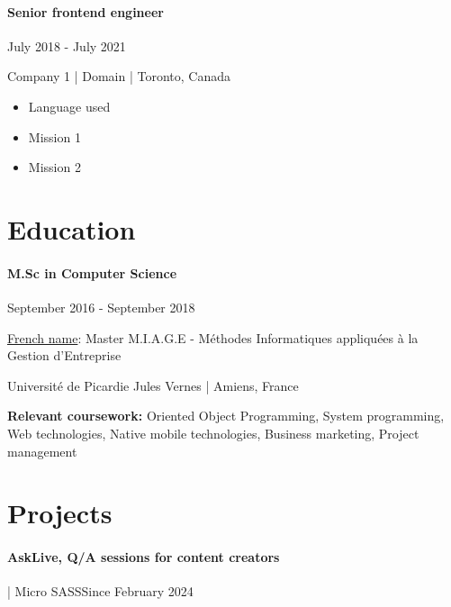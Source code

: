 \documentclass{article}
\begin{document}
\paragraph{Senior frontend engineer}\hspace*{\fill}July 2018 - July 2021

\noindent
Company 1 | Domain | Toronto, Canada

\raggedright  
\begin{itemize}
  \item{Language used}
  \item{Mission 1}
  \item{Mission 2}
\end{itemize}

\vspace{2ex}
\hrulefill
\section*{Education}
\paragraph{M.Sc in Computer Science}\hspace*{\fill}September 2016 - September 2018

\underline{French name}: Master M.I.A.G.E - Méthodes Informatiques appliquées à la Gestion d'Entreprise

Université de Picardie Jules Vernes | Amiens, France

\vspace{\baselineskip}

\textbf{Relevant coursework:} Oriented Object Programming, System programming, Web technologies, Native mobile technologies, Business marketing, Project management

\vspace{2ex}
\hrulefill
\section*{Projects}

\paragraph{AskLive, Q/A sessions for content creators}  | Micro SASS\hspace*{\fill}Since February 2024
\end{document}
